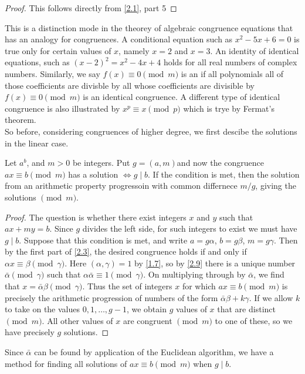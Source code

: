\documentclass[11pt]{article}
\begin{document}
\begin{proof}
    This follows directly from \cref{2.1}, part 5
\end{proof}
This is a distinction mode in the theorey of algebraic congruence equations that has an analogy for congruences. A conditional equation such as \(x^2 - 5x + 6 = 0\) is true only for certain values of \(x\), namely \(x = 2\) and \(x = 3\). An identity of identical equations, such as \((x - 2)^2 = x^2 - 4x + 4\) holds for all real numbers of complex numbers. Similarly, we say \(f(x) \equiv 0 \pmod{m}\) is an  if all polynomials all of those coefficients are divisble by all whose coefficients are divisible by \(f(x) \equiv 0 \pmod{m}\) is an identical congruence. A different type of identical congruence is also illustrated by \(x^p \equiv x \pmod{p}\) which is trye by Fermat's theorem.\\
So before, considering congruences of higher degree, we first descibe the solutions in the linear case.
\begin{theorem}\label{2.17}
    Let \(a^b\), and \(m > 0\) be integers. Put \(g = (a, m)\)and now the congruence \(ax \equiv b \pmod{m}\) has a solution \(\Leftrightarrow g \mid b\). If the condition is met, then the solution from an arithmetic property progressoin with common differnece \(m / g\), giving the solutions \(\pmod{m}\).
\end{theorem}
\begin{proof}
    The question is whether there exist integers \(x\) and \(y\) such that \(ax + my = b\). Since \(g\) divides the left side, for such integers to exist we must have \(g \mid b\). Suppose that this condition is met, and write \(a = g\alpha\), \(b = g\beta\), \(m = g\gamma\). Then by the first part of \cref{2.3}, the desired congruence holds if and only if \(\alpha x \equiv \beta \pmod{\gamma}\). Here \((\alpha, \gamma) = 1\) by \cref{1.7}, so by \cref{2.9} there is a unique number \(\bar{\alpha} \pmod{\gamma}\) such that \(\alpha \bar{\alpha} \equiv 1 \pmod{\gamma}\). On multiplying through by \(\bar{\alpha}\), we find that \(x = \bar{\alpha} \beta \pmod{\gamma}\). Thus the set of integers \(x\) for which \(ax \equiv b \pmod{m}\) is precisely the arithmetic progression of numbers of the form \(\bar{\alpha} \beta + k\gamma\). If we allow \(k\) to take on the values \(0, 1, \ldots, g - 1\), we obtain \(g\) values of \(x\) that are distinct \(\pmod{m}\). All other values of \(x\) are congruent \(\pmod{m}\) to one of these, so we have precisely \(g\) solutions.
\end{proof}
\begin{fact}
    Since \(\bar \alpha\) can be found by application of the Euclidean algorithm, we have a method for finding all solutions of \(ax \equiv b \pmod{m}\) when \(g \mid b\).
\end{fact}
\end{document}
